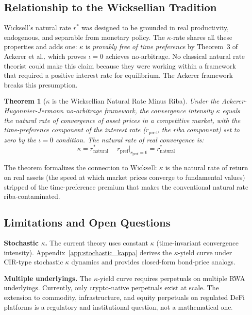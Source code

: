 \documentclass[10pt,twocolumn]{article}
\theoremstyle{plain}
\newtheorem{theorem}{Theorem}
\theoremstyle{definition}
\begin{document}
\subsection{Relationship to the Wicksellian Tradition}

Wicksell's \cite{Wicksell1898} natural rate $r^*$ was designed
to be grounded in real productivity, endogenous, and separable
from monetary policy. The $\kappa$-rate shares all these
properties and adds one: $\kappa$ is \emph{provably free of
time preference} by Theorem~3 of Ackerer et al., which
proves $\iota = 0$ achieves no-arbitrage. No classical
natural rate theorist could make this claim because they
were working within a framework that required a positive
interest rate for equilibrium. The Ackerer framework breaks
this presumption.

\begin{theorem}[$\kappa$ is the Wicksellian Natural Rate Minus Riba]
\label{thm:wicksell}
Under the Ackerer-Hugonnier-Jermann no-arbitrage framework, the
convergence intensity $\kappa$ equals the natural rate of
convergence of asset prices in a competitive market, with
the time-preference component of the interest rate
($r_{\text{pref}}$, the riba component) set to zero by the
$\iota = 0$ condition. The natural rate of real convergence
is:
\begin{equation}
\kappa = r^*_{\text{natural}} - r_{\text{pref}}\big|_{r_{\text{pref}}=0}
= r^*_{\text{natural}}
\label{eq:kappa_natural}
\end{equation}
\end{theorem}

The theorem formalizes the connection to Wicksell: $\kappa$
is the natural rate of return on real assets (the speed at
which market prices converge to fundamental values) stripped
of the time-preference premium that makes the conventional
natural rate riba-contaminated.

\subsection{Limitations and Open Questions}

\textbf{Stochastic $\kappa$.}
The current theory uses constant $\kappa$ (time-invariant
convergence intensity). Appendix~\ref{app:stochastic_kappa}
derives the $\kappa$-yield curve under CIR-type stochastic
$\kappa$ dynamics and provides closed-form bond-price analogs.

\textbf{Multiple underlyings.}
The $\kappa$-yield curve requires perpetuals on multiple
RWA underlyings. Currently, only crypto-native perpetuals
exist at scale. The extension to commodity, infrastructure,
and equity perpetuals on regulated DeFi platforms is a
regulatory and institutional question, not a mathematical one.
\end{document}

